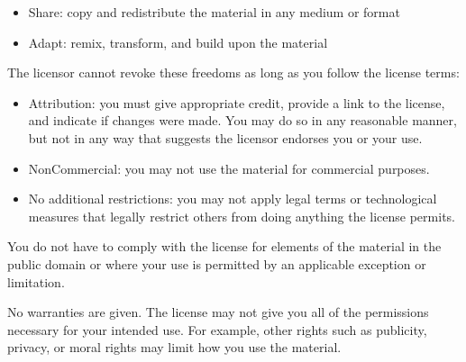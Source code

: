 {  \begin{itemize}
  \item Share: copy and redistribute the material in any medium or format
  \item Adapt: remix, transform, and build upon the material
  \end{itemize}

  The licensor cannot revoke these freedoms as long as you follow the
  license terms:

  \begin{itemize}
  \item Attribution: you must give appropriate credit, provide a link
  to the license, and indicate if changes were made. You may do so in
  any reasonable manner, but not in any way that suggests the licensor
  endorses you or your use.
  \item NonCommercial: you may not use the material for commercial
  purposes.
  \item No additional restrictions: you may not apply legal terms or
  technological measures that legally restrict others from doing
  anything the license permits.
  \end{itemize}

  You do not have to comply with the license for elements of the
  material in the public domain or where your use is permitted by an
  applicable exception or limitation.

  No warranties are given. The license may not give you all of the
  permissions necessary for your intended use. For example, other
  rights such as publicity, privacy, or moral rights may limit how you
  use the material.

 \clearpage

 \thispagestyle{plain}
 \par
}
\makeatother
